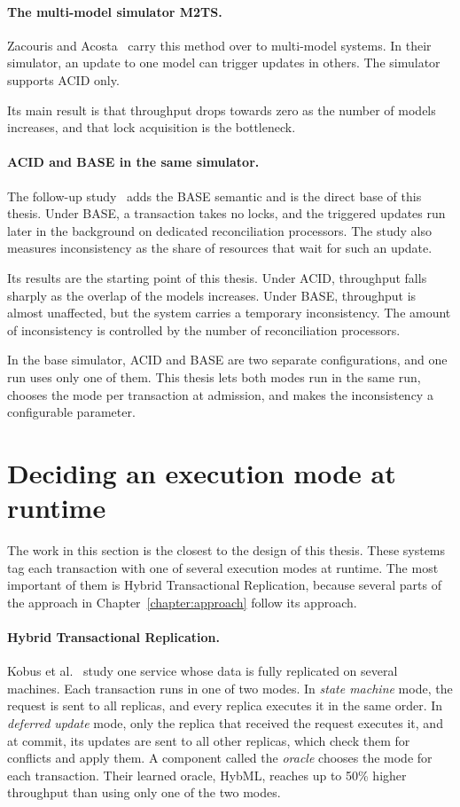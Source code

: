\paragraph{The multi-model simulator M2TS.} Zacouris and
Acosta~\cite{zacouris2025m2ts} carry this method over to multi-model systems. In
their simulator, an update to one model can trigger updates in others. The
simulator supports ACID only.

Its main result is that throughput drops towards zero as the number of models
increases, and that lock acquisition is the bottleneck.

\paragraph{ACID and BASE in the same simulator.} The follow-up
study~\cite{zacouris2026mxs} adds the BASE semantic and is the
direct base of this thesis. Under BASE, a transaction takes no locks, and the
triggered updates run later in the background on dedicated reconciliation
processors. The study also measures inconsistency as the share of resources that
wait for such an update.

Its results are the starting point of this thesis. Under ACID, throughput falls
sharply as the overlap of the models increases. Under BASE, throughput is almost
unaffected, but the system carries a temporary inconsistency. The amount of
inconsistency is controlled by the number of reconciliation processors.

In the base simulator, ACID and BASE are two separate configurations, and one run
uses only one of them. This thesis lets both modes run in the same run, chooses
the mode per transaction at admission, and makes the inconsistency a
configurable parameter.

\section{Deciding an execution mode at runtime}\label{sec:rw-mode-selection}

The work in this section is the closest to the design of this thesis. These
systems tag each transaction with one of several execution modes at runtime. The
most important of them is Hybrid Transactional Replication, because several
parts of the approach in Chapter~\ref{chapter:approach} follow its approach.

\paragraph{Hybrid Transactional Replication.} Kobus et al.~\cite{kobus2018htr}
study one service whose data is fully replicated on several machines. Each
transaction runs in one of two modes. In \emph{state machine} mode, the request
is sent to all replicas, and every replica executes it in the same order. In
\emph{deferred update} mode, only the replica that received the request executes
it, and at commit, its updates are sent to all other replicas, which check them for
conflicts and apply them. A component called the \emph{oracle} chooses the mode
for each transaction. Their learned oracle, HybML, reaches up to 50\% higher
throughput than using only one of the two modes.

